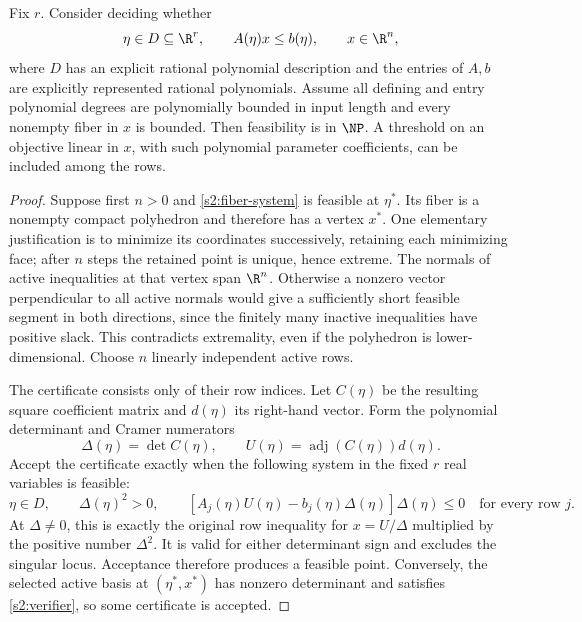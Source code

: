 \begin{theorem}\label{s2:fiber-np}
Fix $r$. Consider deciding whether
\begin{equation}
 \eta\in D\subseteq\R^r,\qquad A(\eta)x\le b(\eta),
 \qquad x\in\R^n,\label{s2:fiber-system}
\end{equation}
where $D$ has an explicit rational polynomial description and the
entries of $A,b$ are explicitly represented rational polynomials.
Assume all defining and entry polynomial degrees are polynomially bounded
in input length and
every nonempty fiber in $x$ is bounded. Then feasibility is in $\NP$.
A threshold on an objective linear in $x$, with such polynomial
parameter coefficients, can be included among the rows.
\end{theorem}
\begin{proof}
Suppose first $n>0$ and \eqref{s2:fiber-system} is feasible at
$\eta^*$. Its fiber is a nonempty compact polyhedron and therefore has
a vertex $x^*$. One elementary justification is to minimize its
coordinates successively, retaining each minimizing face; after $n$
steps the retained point is unique, hence extreme. The normals of
active inequalities at that vertex span $\R^n$. Otherwise a nonzero
vector perpendicular to all active normals would give a sufficiently
short feasible segment in both directions, since the finitely many
inactive inequalities have positive slack. This contradicts
extremality, even if the polyhedron is lower-dimensional. Choose $n$
linearly independent active rows.

The certificate consists only of their row indices. Let $C(\eta)$ be
the resulting square coefficient matrix and $d(\eta)$ its right-hand
vector. Form the polynomial determinant and Cramer numerators
\[
 \Delta(\eta)=\det C(\eta),\qquad
 U(\eta)=\operatorname{adj}(C(\eta))d(\eta).
\]
Accept the certificate exactly when the following system in the fixed
$r$ real variables is feasible:
\begin{equation}
 \eta\in D,\qquad \Delta(\eta)^2>0,\qquad
 [A_j(\eta)U(\eta)-b_j(\eta)\Delta(\eta)]\Delta(\eta)\le0
 \quad\text{for every row }j.\label{s2:verifier}
\end{equation}
At $\Delta\ne0$, this is exactly the original row inequality for
$x=U/\Delta$ multiplied by the positive number $\Delta^2$.
It is valid for either determinant sign and excludes the singular
locus. Acceptance therefore produces a feasible point. Conversely,
the selected active basis at $(\eta^*,x^*)$ has nonzero determinant
and satisfies \eqref{s2:verifier}, so some certificate is accepted.


\end{proof}
